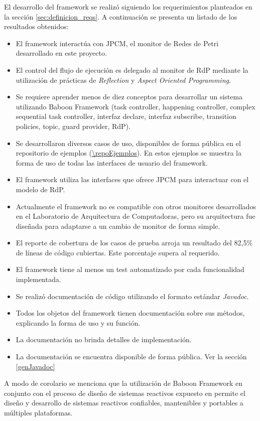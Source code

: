 El desarrollo del framework se realizó siguiendo los requerimientos planteados
en la sección \ref{sec:definicion_reqs}. A continuación se presenta un listado
de los resultados obtenidos:
\begin{itemize}
  \item El framework interactúa con JPCM, el monitor de Redes de Petri
  desarrollado en este proyecto.
  \item El control del flujo de ejecución es delegado al monitor de RdP
  mediante la utilización de prácticas de \textit{Reflection} y \textit{Aspect
  Oriented Programming}.
  \item Se requiere aprender menos de diez conceptos para desarrollar un
  sistema utilizando Baboon Framework (task controller, happening
  controller, complex sequential task controller, interfaz declare, interfaz
  subscribe, transition policies, topic, guard provider, RdP).
  \item Se desarrollaron diversos casos de uso, disponibles de forma pública en
  el repositorio de ejemplos (\url{\repoEjemplos}). En estos ejemplos se muestra
  la forma de uso de todas las interfaces de usuario del framework.
  \item El framework utiliza las interfaces que ofrece JPCM para interactuar con
  el modelo de RdP.
  \item Actualmente el framework no es compatible con otros monitores
  desarrollados en el Laboratorio de Arquitectura de Computadoras, pero su
  arquitectura fue diseñada para adaptarse a un cambio de monitor de forma
  simple.
  \item El reporte de cobertura de los casos de prueba arroja un resultado del
  82,5\% de líneas de código cubiertas. Este porcentaje supera al requerido.
  \item El framework tiene al menos un test automatizado por cada funcionalidad
  implementada.
  \item Se realizó documentación de código utilizando el formato estándar
  \textit{Javadoc}.
  \item Todos los objetos del framework tienen documentación sobre sus métodos,
  explicando la forma de uso y su función.
  \item La documentación no brinda detalles de implementación.
  \item La documentación se encuentra disponible de forma pública. Ver la
  sección \ref{genJavadoc}
\end{itemize}

A modo de corolario se menciona que la utilización de Baboon Framework
en conjunto con el proceso de diseño de sistemas reactivos expuesto en
\cite{Bentivegna-Ludemann} permite el diseño y desarrollo de sistemas reactivos
confiables, mantenibles y portables a múltiples plataformas.
